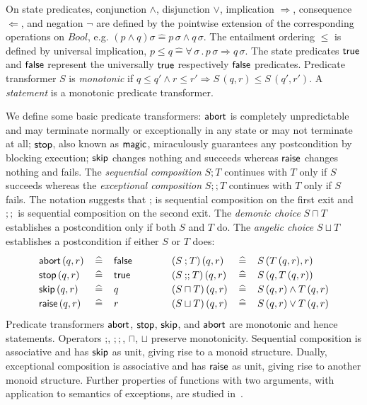 \documentclass[submission,copyright,creativecommons]{eptcs}
\newcommand{\KW}[1]{\mathop{\sf #1}}
\newcommand{\TRUE}{\KW{true}}
\newcommand{\FALSE}{\KW{false}}
\newcommand{\ABORT}{\KW{abort}}
\newcommand{\SKIP}{\KW{skip}}
\newcommand{\RAISE}{\KW{raise}}
\newcommand{\STOP}{\KW{stop}}
\newcommand{\MAGIC}{\KW{magic}}
\newcommand{\semi}{\mathbin{;}}
\newcommand{\meet}{\sqcap}
\newcommand{\join}{\sqcup}
\newcommand{\SEMI}{\mathbin{;\!;}}
\newcommand{\con}{\wedge}
\newcommand{\dis}{\vee}
\newcommand{\imp}{\Rightarrow}
\newcommand{\cons}{\Leftarrow}
\renewcommand{\dot}{\mathop{.}}
\newcommand{\defeq}{\left.\widehat{=}\right.}
\begin{document}
On state predicates, conjunction $\con$, disjunction $\dis$, implication $\imp$, consequence $\cons$, and negation $\neg$ are defined by the pointwise extension of the corresponding operations on $Bool$, e.g. $(p \con q) \sigma \defeq p\,\sigma \con q\,\sigma$. The entailment ordering $\leq$ is defined by universal implication, $p \leq q \defeq \forall\, \sigma \dot p\,\sigma \imp q\,\sigma$. The state predicates $\TRUE$ and $\FALSE$ represent the universally $\TRUE$ respectively $\FALSE$ predicates. Predicate transformer $S$ is {\em monotonic} if $q \leq q' \con r \leq r' \imp S\,(q, r) \leq S\,(q', r')$. A {\em statement} is a monotonic predicate transformer.



We define some basic predicate transformers: $\ABORT$ is completely unpredictable and may terminate normally or exceptionally in any state or may not terminate at all; $\STOP$, also known as $\MAGIC$, miraculously guarantees any postcondition by blocking execution; $\SKIP$ changes nothing and succeeds whereas $\RAISE$ changes nothing and fails. The {\em sequential composition} $S \semi T$ continues with $T$ only if $S$ succeeds whereas the {\em exceptional composition} $S \SEMI T$ continues with $T$ only if $S$ fails. The notation suggests that $\semi$ is sequential composition on the first exit and $\SEMI$ is sequential composition on the second exit. The {\em demonic choice} $S \meet T$ establishes a postcondition only if both $S$ and $T$ do. The {\em angelic choice} $S \join T$ establishes a postcondition if either $S$ or $T$ does:
\[\renewcommand{\arraystretch}{1.2}\begin{array}{lcl@{\qquad\qquad}lcl}
   \ABORT\,(q, r) & \defeq & \FALSE & (S \semi T)\,(q, r) & \defeq & S\,(T\,(q, r), r) \\
   \STOP\,(q, r)  & \defeq & \TRUE  & (S \SEMI T)\,(q, r) & \defeq & S\,(q, T\,(q, r)) \\
   \SKIP\,(q, r)  & \defeq & q      & (S \meet T)\,(q, r) & \defeq & S\,(q, r) \con T\,(q, r) \\
   \RAISE\,(q, r) & \defeq & r      & (S \join T)\,(q, r) & \defeq & S\,(q, r) \dis T\,(q, r)
\end{array}\]
Predicate transformers $\ABORT$, $\STOP$, $\SKIP$, and $\ABORT$ are monotonic and hence statements. Operators $\semi$, $\SEMI$, $\meet$, $\join$ preserve monotonicity. Sequential composition is associative and has $\SKIP$ as unit, giving rise to a monoid structure. Dually, exceptional composition is associative and has $\RAISE$ as unit, giving rise to another monoid structure. Further properties of functions with two arguments, with application to semantics of exceptions, are studied in~\cite{LeinoSnepscheut94SemanticsExceptions, ManoharLeino95ConditionalComposition}.
\end{document}
